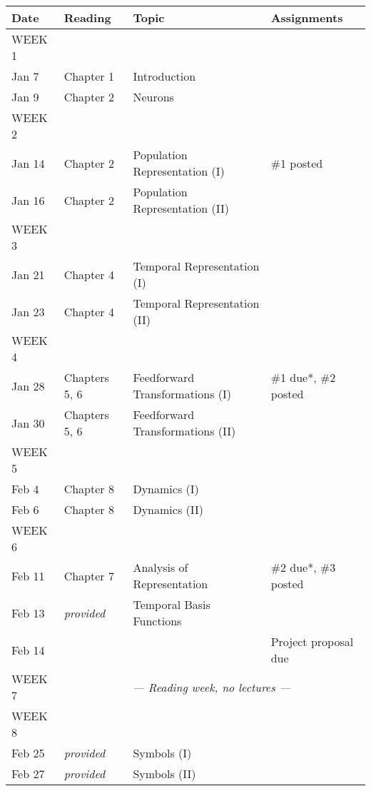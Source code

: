 \documentclass[10pt,letterpaper,oneside]{article}
\begin{document}
\begin{center}
\small
\begin{tabular}{p{2.5cm} p{2.5cm} p{6cm} p{3.75cm}}
	\toprule
	\textbf{Date} &	\textbf{Reading} &	\textbf{Topic} & \textbf{Assignments} \\
	\midrule
	\footnotesize WEEK 1 & & & \\
	Jan 7 &
	Chapter 1 &
	Introduction &
	\\
	Jan 9 &
	Chapter 2 &
	Neurons &
	\\[0.125cm]
	
	\footnotesize WEEK 2 & & & \\
	Jan 14 &
	Chapter 2 &
	Population Representation (I) &
	\#1 posted\\
	Jan 16 &
	Chapter 2 &
	Population Representation (II) &
	\\[0.125cm]

	\footnotesize WEEK 3 & & & \\
	Jan 21 &
	Chapter 4 &
	Temporal Representation (I) &
	\\
	Jan 23 &
	Chapter 4 &
	Temporal Representation (II) &
	\\[0.125cm]

	\footnotesize WEEK 4 & & & \\
	Jan 28 &
	Chapters 5, 6 &
	Feedforward Transformations (I) &
	\#1 due*, \#2 posted\\
	Jan 30 &
	Chapters 5, 6 &
	Feedforward Transformations (II) &
	\\[0.125cm]

	\footnotesize WEEK 5 & & & \\
	Feb 4 &
	Chapter 8 &
	Dynamics (I) &
	\\
	Feb 6 &
	Chapter 8 &
	Dynamics (II) &
	\\[0.125cm]

	\footnotesize WEEK 6 & & & \\
	Feb 11 &
	Chapter 7 &
	Analysis of Representation &
	\#2 due*, \#3 posted\\
	Feb 13 &
	\emph{provided} &
	Temporal Basis Functions &
	\\
	Feb 14 &
	&
	&
	Project proposal due\\[0.125cm]

	\footnotesize WEEK 7 & \multicolumn{3}{c}{\emph{--- Reading week, no lectures ---}} \\[0.125cm]

	\footnotesize WEEK 8 & & & \\
	Feb 25 &
	\emph{provided} &
	Symbols (I) &
	\\
	Feb 27 &
	\emph{provided} &
	Symbols (II) &
	\\[0.125cm]


\end{tabular}
\end{center}
\end{document}
